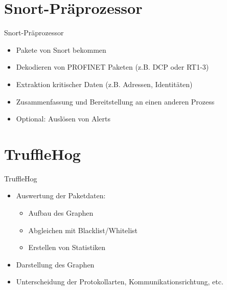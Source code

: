 \documentclass[18pt]{beamer}
\begin{document}
\section{Snort-Präprozessor}
\begin{frame}{Snort-Präprozessor}
    \begin{itemize}
      \item Pakete von Snort bekommen
      \pause
      \item Dekodieren von PROFINET Paketen (z.B. DCP oder RT1-3)
      \pause
      \item Extraktion kritischer Daten (z.B. Adressen, Identitäten)
      \pause
      \item Zusammenfassung und Bereitstellung an einen anderen Prozess
      \pause
      \item Optional: Auslösen von Alerts
    \end{itemize}
\end{frame}


\section{TruffleHog}
\begin{frame}{TruffleHog}
    \begin{itemize}
      \item Auswertung der Paketdaten: \pause
      \begin{itemize}
        \item Aufbau des Graphen \pause
        \item Abgleichen mit Blacklist/Whitelist \pause
        \item Erstellen von Statistiken \pause
      \end{itemize}
      
      \item Darstellung des Graphen  \pause
      \item Unterscheidung der Protokollarten, Kommunikationsrichtung, etc.
      
    \end{itemize}
\end{frame}
\end{document}

